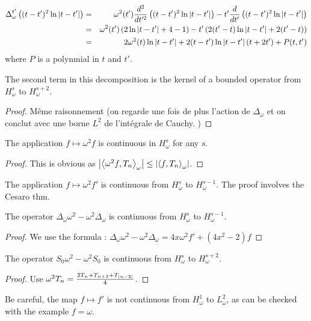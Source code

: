 \documentclass[]{article}
\begin{document}
\begin{Lem}
	\begin{eqnarray*}
		\Delta_{\omega}^{t'} \left((t-t')^2\ln\left\lvert t-t' \right\rvert\right) &=& \omega^2(t')\frac{d^2}{dt'^2}\left((t-t')^2\ln\left\lvert t-t' \right\rvert\right) - t' \frac{d}{dt'} \left((t-t')^2\ln\left\lvert t-t' \right\rvert\right)\\
		&=&\omega^2(t')\left(2\ln\left\lvert t-t' \right\rvert + 4 - 1\right) - t'\left(2(t'-t)\ln\left\lvert t-t' \right\rvert + 2(t'-t)\right)\\
		&=&2\omega^2(t)\ln\left\lvert t-t' \right\rvert + 2(t-t')\ln\left\lvert t-t' \right\rvert(t + 2t') + P(t,t')
	\end{eqnarray*}
	where $P$ is a polynmial in $t$ and $t'$. 
\end{Lem}
\begin{Lem}
	The second term in this decomposition is the kernel of a bounded operator from $H^s_{\omega}$ to $H^{s+2}_{\omega}$.
	\begin{proof}
		Même raisonnement (on regarde une fois de plus l'action de $\Delta_\omega$ et on conclut avec une borne $L^2$ de l'intégrale de Cauchy. )
	\end{proof}
\end{Lem}
\begin{Lem}
	The application $f \mapsto \omega^2 f$ is continuous in $H^s_{\omega}$ for any $s$. 
	\begin{proof}
		This is obvious as $\left\lvert \left\langle \omega^2f,T_n\right\rangle_{\omega} \right\rvert \leq  \left\lvert \left\langle f,T_n\right\rangle_{\omega} \right\rvert$.
	\end{proof}
\end{Lem}
\begin{Lem}
	The application $f \mapsto \omega^2 f'$ is continuous from $H^s_\omega$ to $H^{s-1}_\omega$.
	The proof involves the Cesaro thm. 
\end{Lem}
\begin{Lem}
	The operator $\Delta_{\omega}\omega^2 - \omega^2 \Delta_{\omega}$ is continuous from $H_{\omega}^s$ to $H_{\omega}^{s-1}$. 
	\begin{proof}
		We use the formula : $\Delta_{\omega}\omega^2 - \omega^2 \Delta_{\omega} = 4x\omega^2f' + (4x^2 - 2)f$
	\end{proof}
\end{Lem}
\begin{Lem}
	The operator $S_0\omega^2 - \omega^2S_0$ is continuous from $H^s_{\omega}$ to $H^{s+2}_\omega$.
	\begin{proof}
		Use $\omega^2 T_n = \frac{2T_n + T_{n+2} + T_{\left\lvert n-2 \right\rvert}}{4}$.
	\end{proof} 
\end{Lem}
Be careful, the map $f\mapsto f'$ is not continuous from $H^1_{\omega}$ to $L^2_{\omega}$, as can be checked with the example $f = \omega$. 
\end{document}
